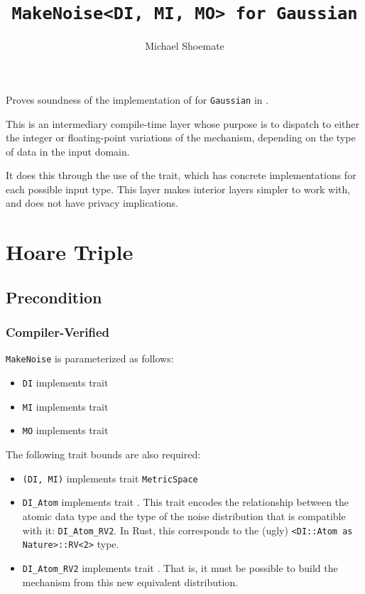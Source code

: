 \documentclass{article}
\title{\texttt{MakeNoise<DI, MI, MO> for Gaussian}}
\author{Michael Shoemate}
\date{}
\begin{document}
\maketitle

\contrib
Proves soundness of the implementation of  
for \texttt{Gaussian} in .

This is an intermediary compile-time layer whose purpose is 
to dispatch to either the integer or floating-point variations of the mechanism,
depending on the type of data in the input domain.

It does this through the use of the  trait,
which has concrete implementations for each possible input type.
This layer makes interior layers simpler to work with, and does not have privacy implications.

\section{Hoare Triple}
\subsection*{Precondition}
\subsubsection*{Compiler-Verified}
\texttt{MakeNoise} is parameterized as follows:
\begin{itemize}
    \item \texttt{DI} implements trait 
    \item \texttt{MI} implements trait 
    \item \texttt{MO} implements trait 
\end{itemize}

The following trait bounds are also required:
\begin{itemize}
    \item \texttt{(DI, MI)} implements trait \texttt{MetricSpace}
    \item \texttt{DI\_Atom} implements trait .
        This trait encodes the relationship between the atomic data type 
        and the type of the noise distribution that is compatible with it: \texttt{DI\_Atom\_RV2}.
        In Rust, this corresponds to the (ugly) \texttt{<DI::Atom as Nature>::RV<2>} type.
    \item \texttt{DI\_Atom\_RV2} implements trait .
        That is, it must be possible to build the mechanism from this new equivalent distribution.
\end{itemize}
\end{document}
